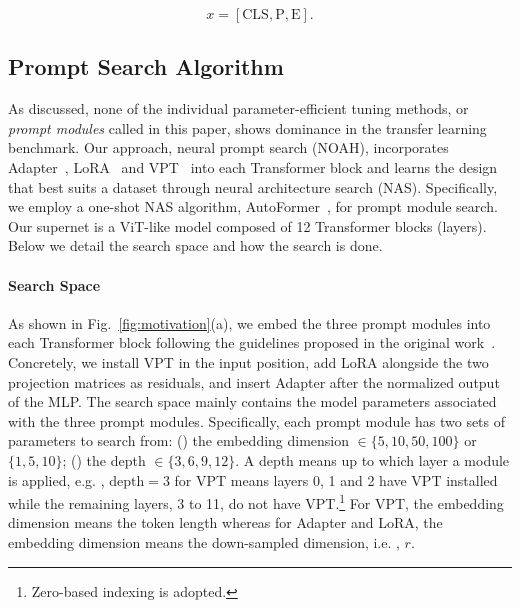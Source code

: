 \begin{equation}
\label{eqn:vpt}
x = [ \text{CLS}, \text{P}, \text{E} ].
\end{equation}

\subsection{Prompt Search Algorithm}
\label{sec:method;subsec:prompt_search_alg}

As discussed, none of the individual parameter-efficient tuning methods, or \emph{prompt modules} called in this paper, shows dominance in the transfer learning benchmark. Our approach, neural prompt search (NOAH), incorporates Adapter~\cite{houlsby2019parameter}, LoRA~\cite{hu2021lora} and VPT~\cite{jia2022visual} into each Transformer block and learns the design that best suits a dataset through neural architecture search (NAS). Specifically, we employ a one-shot NAS algorithm, AutoFormer~\cite{chen2021autoformer}, for prompt module search. Our supernet is a ViT-like model composed of 12 Transformer blocks (layers). Below we detail the search space and how the search is done.

\paragraph{Search Space} As shown in Fig.~\ref{fig:motivation}(a), we embed the three prompt modules into each Transformer block following the guidelines proposed in the original work~\cite{houlsby2019parameter,hu2021lora,jia2022visual}. Concretely, we install VPT in the input position, add LoRA alongside the two projection matrices as residuals, and insert Adapter after the normalized output of the MLP. The search space mainly contains the model parameters associated with the three prompt modules. Specifically, each prompt module has two sets of parameters to search from: () the embedding dimension $\in \{5, 10, 50, 100\}$ or $\{1, 5, 10\}$; () the depth $\in \{3, 6, 9, 12\}$. A depth means up to which layer a module is applied, e.g. , $\text{depth} = 3$ for VPT means layers 0, 1 and 2 have VPT installed while the remaining layers, 3 to 11, do not have VPT.\footnote{Zero-based indexing is adopted.} For VPT, the embedding dimension means the token length whereas for Adapter and LoRA, the embedding dimension means the down-sampled dimension, i.e. , $r$.


